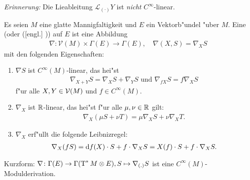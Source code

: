 \emph{Erinnerung:} Die Lieableitung $\mathcal L_{(\cdot)}Y$ ist \emph{nicht} $C^{\infty}$-linear.

\begin{Dfn}
  Es seien $M$ eine glatte Mannigfaltigkeit und $E$ ein Vektorb"undel "uber $M$.
  Eine  (oder  ([engl.] )) auf $E$ ist eine Abbildung
  \begin{align*}
    \nabla \colon \mathcal V(M) \times \Gamma(E) \to \Gamma(E), \quad \nabla(X,S) = \nabla_XS
  \end{align*}
  mit den folgenden Eigenschaften:
  \begin{enumerate}[label=(\roman*),widest=iii]
  \item $\nabla S$ ist $C^{\infty}(M)$-linear, das hei"st
    \begin{align*}
      \nabla_{X+Y}S = \nabla_XS+\nabla_YS \text{ und } \nabla_{fX}S = f\nabla_XS
    \end{align*}
    f"ur alle $X, Y \in \operatorname{\mathcal{V}}(M)$ und $f \in C^{\infty}(M)$.
  \item $\nabla_X$ ist $\operatorname{\mathbb{R}}$-linear, das hei"st f"ur alle $\mu, \nu \in \operatorname{\mathbb{R}}$ gilt:
    \begin{align*}
      \nabla_X(\mu S + \nu T) = \mu\nabla_XS + \nu\nabla_XT.
    \end{align*}
  \item $\nabla_X$ erf"ullt die folgende Leibnizregel:
    \begin{align*}
      \nabla_X(fS) = \mathrm{d} f(X) \cdot S + f\cdot \nabla_XS = X(f)\cdot S + f \cdot \nabla_XS.
    \end{align*}
  \end{enumerate}
  Kurzform: $\nabla \colon \Gamma(E) \to \Gamma(\operatorname{T}^{*}M \otimes E), S \mapsto \nabla_{(.)}S$ ist eine $C^{\infty}(M)$-Modulderivation.
\end{Dfn}

